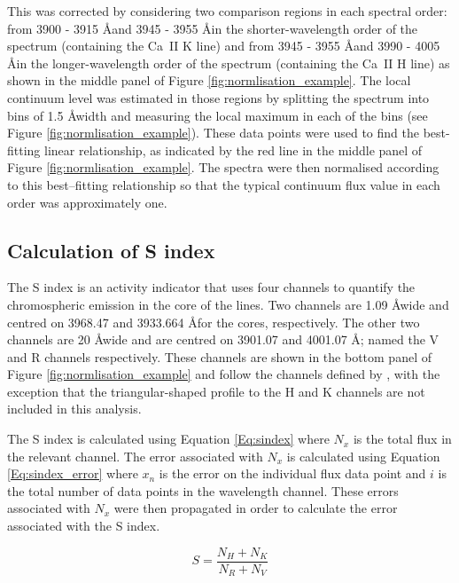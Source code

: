 This was corrected by considering two comparison regions in each spectral order: from 3900 - 3915 \AA \space and 3945 - 3955 \AA \space in the shorter-wavelength order of the spectrum (containing the Ca~II K line) and from 3945 - 3955 \AA \space and 3990 - 4005 \AA \space in the longer-wavelength order of the spectrum (containing the Ca~II H line) as shown in the middle panel of Figure \ref{fig:normlisation_example}. The local continuum level was estimated in those regions by splitting the spectrum into bins of 1.5 \AA \space width and measuring the local maximum in each of the bins (see Figure \ref{fig:normlisation_example}). These data points were used to find the best-fitting linear relationship, as indicated by the red line in the middle panel of Figure \ref{fig:normlisation_example}. The spectra were then normalised according to this best--fitting relationship so that the typical continuum flux value in each order was approximately one.

\subsection{Calculation of S index}
\label{Chp4_data_analysis_calc_S}
The S index is an activity indicator that uses four channels to quantify the chromospheric emission in the core of the \caII lines. Two channels are 1.09 \AA \space wide and centred on 3968.47 and 3933.664 \AA \space for the \caII cores, respectively. The other two channels are 20 \AA \space wide and are centred on 3901.07 and 4001.07 \AA; named the V and R channels respectively. These channels are shown in the bottom panel of Figure \ref{fig:normlisation_example} and follow the channels defined by \citet{Lovis_etal_2011}, with the exception that the triangular-shaped profile to the H and K channels are not included in this analysis.

The S index is calculated using Equation \ref{Eq:sindex} where $N_{x}$ is the total flux in the relevant channel. The error associated with $N_{x}$ is calculated using Equation \eqref{Eq:sindex_error} where $x_{n}$ is the error on the individual flux data point and $i$ is the total number of data points in the wavelength channel. These errors associated with $N_{x}$ were then propagated in order to calculate the error associated with the S index.

\begin{equation}
S = \frac{N_{H} + N_{K}}{N_{R} + N_{V}}
\label{Eq:sindex}
\end{equation}

